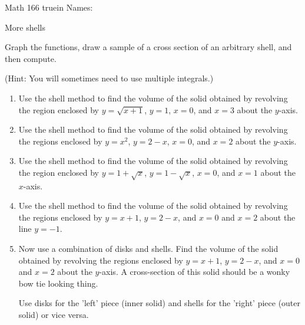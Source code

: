 \documentclass[12pt]{article}
\newtheorem*{goal}{Goal}
\begin{document}
\pagestyle{empty} %

\noindent
{Math 166  truein  Names:\ \hrulefill}

\noindent
{More shells}

\medskip

\noindent Graph the functions, draw a sample of a cross section of an arbitrary shell, and then compute.

\noindent(Hint: You will sometimes need to use multiple integrals.)

\begin{enumerate}

\item Use the shell method to find the volume of the solid obtained by revolving the region enclosed by $y = \sqrt{x+1}$, $y = 1$, $x = 0$, and $x=3$ about the $y$-axis.

\vspace{4in}
	
\item Use the shell method to find the volume of the solid obtained by revolving the regions enclosed by $y = x^2$, $y = 2-x$, $x = 0$, and $x=2$ about the $y$-axis.


\vspace{4in}

\item Use the shell method to find the volume of the solid obtained by revolving the region enclosed by $y = 1+\sqrt{x}$, $y = 1-\sqrt{x}$, $x = 0$, and $x=1$ about the $x$-axis.

\vspace{4in}

\item Use the shell method to find the volume of the solid obtained by revolving the regions enclosed by $y = x+1$, $y = 2 - x$, and $x = 0$  and $x=2$ about the line $y= -1$.
\newpage

\item Now use a combination of disks and shells. Find the volume of the solid obtained by revolving the regions enclosed by $y = x+1$, $y = 2 - x$, and $x = 0$  and $x=2$ about the $y$-axis. A cross-section of this solid should be a wonky bow tie looking thing.

Use disks for the 'left' piece (inner solid) and shells for the 'right' piece (outer solid) or vice versa.

\end{enumerate}
\end{document}
